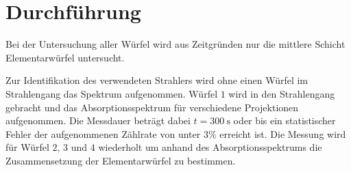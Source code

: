\section{Durchführung}
\label{sec:Durchführung}

Bei der Untersuchung aller Würfel wird aus Zeitgründen nur die mittlere Schicht Elementarwürfel untersucht.

Zur Identifikation des verwendeten Strahlers wird ohne einen Würfel im Strahlengang das Spektrum aufgenommen.
Würfel $1$ wird in den Strahlengang gebracht und das Absorptionsspektrum für verschiedene Projektionen aufgenommen. Die Messdauer beträgt dabei $t=\SI{300}{\second}$ oder bis ein statistischer Fehler der aufgenommenen Zählrate von unter $3\%$ erreicht ist.
Die Messung wird für Würfel $2$, $3$ und $4$ wiederholt um anhand des Absorptionsspektrums die Zusammensetzung der Elementarwürfel zu bestimmen.